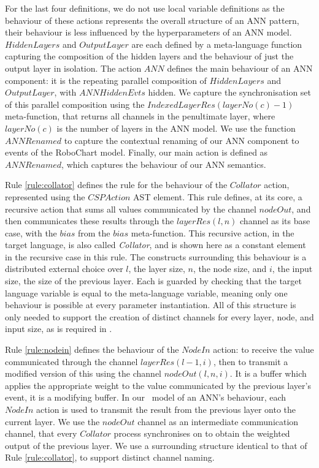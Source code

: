 For the last four definitions, we do not use local variable definitions as the behaviour of these actions represents the overall structure of an ANN pattern, their behaviour is less influenced by the hyperparameters of an ANN model. $HiddenLayers$ and $OutputLayer$ are each defined by a meta-language function capturing the composition of the hidden layers and the behaviour of just the output layer in isolation. The action $ANN$ defines the main behaviour of an ANN component: it is the repeating parallel composition of $HiddenLayers$ and $OutputLayer$, with $ANNHiddenEvts$ hidden. We capture the synchronisation set of this parallel composition using the $IndexedLayerRes(layerNo(c) - 1)$ meta-function, that returns all channels in the penultimate layer, where $layerNo(c)$ is the number of layers in the ANN model. We use the function $ANNRenamed$ to capture the contextual renaming of our ANN component to events of the RoboChart model. Finally, our main action is defined as $ANNRenamed$, which captures the behaviour of our ANN semantics. 

Rule \ref{rule:collator} defines the rule for the behaviour of the $Collator$ action, represented using the $CSPAction$ AST element. This rule defines, at its core, a recursive action that sums all values communicated by the channel $nodeOut$, and then communicates these results through the $layerRes(l,n)$ channel as its base case, with the $bias$ from the $bias$ meta-function. This recursive action, in the target language, is also called \textit{Collator}, and is shown here as a constant element in the recursive case in this rule. The constructs surrounding this behaviour is a distributed external choice over $l$, the layer size, $n$, the node size, and $i$, the input size, the size of the previous layer. Each is guarded by checking that the target language variable is equal to the meta-language variable, meaning only one behaviour is possible at every parameter instantiation. All of this structure is only needed to support the creation of distinct channels for every layer, node, and input size, as is required in \Circus. 

Rule \ref{rule:nodein} defines the behaviour of the $NodeIn$ action: to receive the value communicated through the channel $layerRes(l-1, i)$, then to transmit a modified version of this using the channel $nodeOut(l,n,i)$. It is a buffer which applies the appropriate weight to the value communicated by the previous layer's event, it is a modifying buffer. In our \Circus \ model of an ANN's behaviour, each $NodeIn$ action is used to transmit the result from the previous layer onto the current layer. We use the $nodeOut$ channel as an intermediate communication channel, that every $Collator$ process synchronises on to obtain the weighted output of the previous layer. We use a surrounding structure identical to that of Rule \ref{rule:collator}, to support distinct channel naming. 
 
